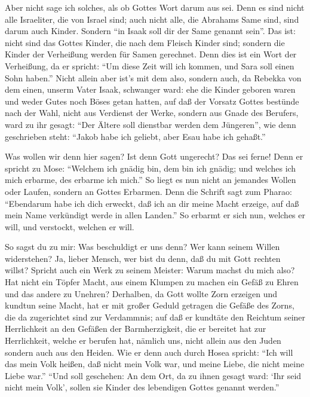  Aber nicht sage ich solches, als ob Gottes Wort darum aus
sei. Denn es sind nicht alle Israeliter, die von Israel sind;
 auch nicht alle, die Abrahams Same sind, sind darum auch
Kinder. Sondern ``in Isaak soll dir der Same genannt sein''.
 Das ist: nicht sind das Gottes Kinder, die nach dem Fleisch
Kinder sind; sondern die Kinder der Verheißung werden für Samen
gerechnet.  Denn dies ist ein Wort der Verheißung, da er
spricht: ``Um diese Zeit will ich kommen, und Sara soll einen Sohn
haben.''  Nicht allein aber ist's mit dem also, sondern
auch, da Rebekka von dem einen, unserm Vater Isaak, schwanger ward:
 ehe die Kinder geboren waren und weder Gutes noch Böses
getan hatten, auf daß der Vorsatz Gottes bestünde nach der Wahl,
 nicht aus Verdienst der Werke, sondern aus Gnade des
Berufers, ward zu ihr gesagt: ``Der Ältere soll dienstbar werden dem
Jüngeren'',  wie denn geschrieben steht: ``Jakob habe ich
geliebt, aber Esau habe ich gehaßt.''

 Was wollen wir denn hier sagen? Ist denn Gott ungerecht?
Das sei ferne!  Denn er spricht zu Mose: ``Welchem ich
gnädig bin, dem bin ich gnädig; und welches ich mich erbarme, des
erbarme ich mich.''  So liegt es nun nicht an jemandes
Wollen oder Laufen, sondern an Gottes Erbarmen.  Denn die
Schrift sagt zum Pharao: ``Ebendarum habe ich dich erweckt, daß ich an
dir meine Macht erzeige, auf daß mein Name verkündigt werde in allen
Landen.''  So erbarmt er sich nun, welches er will, und
verstockt, welchen er will.

 So sagst du zu mir: Was beschuldigt er uns denn? Wer kann
seinem Willen widerstehen?  Ja, lieber Mensch, wer bist du
denn, daß du mit Gott rechten willst? Spricht auch ein Werk zu seinem
Meister: Warum machst du mich also?  Hat nicht ein Töpfer
Macht, aus einem Klumpen zu machen ein Gefäß zu Ehren und das andere zu
Unehren?  Derhalben, da Gott wollte Zorn erzeigen und
kundtun seine Macht, hat er mit großer Geduld getragen die Gefäße des
Zorns, die da zugerichtet sind zur Verdammnis;  auf daß er
kundtäte den Reichtum seiner Herrlichkeit an den Gefäßen der
Barmherzigkeit, die er bereitet hat zur Herrlichkeit, 
welche er berufen hat, nämlich uns, nicht allein aus den Juden sondern
auch aus den Heiden.  Wie er denn auch durch Hosea spricht:
``Ich will das mein Volk heißen, daß nicht mein Volk war, und meine
Liebe, die nicht meine Liebe war.''  ``Und soll geschehen:
An dem Ort, da zu ihnen gesagt ward: `Ihr seid nicht mein Volk', sollen
sie Kinder des lebendigen Gottes genannt werden.''

